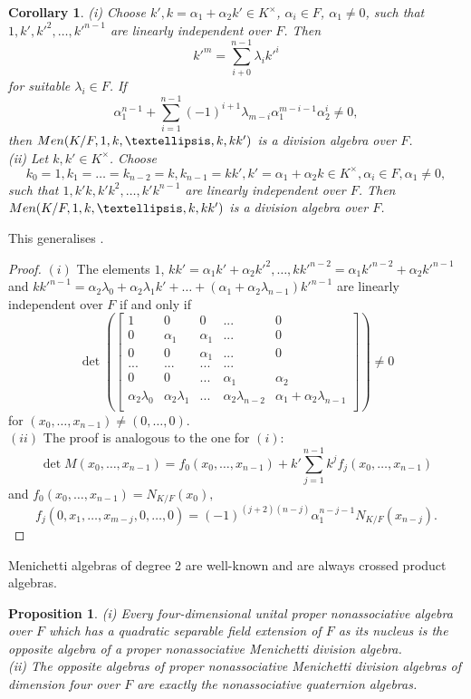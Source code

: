 \documentclass[11pt]{amsart}
\theoremstyle{plain}
\newtheorem{proposition}[theorem]{Proposition}
\newtheorem{corollary}[theorem]{Corollary}
\theoremstyle{definition}
\begin{document}
 \begin{corollary}  \label{cor:M1}
 (i) Choose $k',k=\alpha_1+\alpha_2k'\in K^\times$, $\alpha_i\in F$, $\alpha_1\not=0$, such that $1,k',k'^2,\dots,k'^{n-1}$ are linearly independent over $F$.
  Then
 $$k'^{m}=\sum_{i+0}^{n-1}\lambda_i k'^i$$
  for suitable $\lambda_i\in F$. If
 $$\alpha_1^{n-1}+\sum_{i=1}^{n-1} (-1)^{i+1}\lambda_{m-i}\alpha_1^{m-i-1} \alpha_2^{i}\not=0,$$
 then ${\rm Men}(K/F,1,k,\dots,k,kk')$ is a division algebra  over $F$.
 \\ (ii) Let $k,k'\in K^\times$.
 Choose
 $$k_0=1, k_1=\dots=k_{n-2}=k, k_{n-1}=kk', k'=\alpha_1+\alpha_2k\in K^\times, \alpha_i\in F, \alpha_1\not=0,$$
  such that $1,k'k,k'k^2,\dots,k'k^{n-1}$ are linearly independent over $F$. Then ${\rm Men}(K/F,1,k,\dots,k,kk')$ is a division algebra  over $F$.
 \end{corollary}


This generalises \cite[p. 345]{M}.


 \begin{proof}
 $(i)$ The elements $1$, $kk'=\alpha_1k'+\alpha_2k'^2, \dots,kk'^{n-2}=\alpha_1k'^{n-2}+\alpha_2k'^{n-1}$ and
 $kk'^{n-1}=\alpha_2\lambda_0+   \alpha_2\lambda_1k'+\dots+ (\alpha_1+\alpha_2 \lambda_{n-1})k'^{n-1}$  are linearly independent over $F$ if and only if
 \[\det(\left [\begin {array}{ccccccc}
1 & 0 & 0 &... & 0\\
0 & \alpha_1 & \alpha_1&... &  0\\
0& 0 & \alpha_1 & ... & 0\\
...& ...  & ... & ...\\
0 &  0  & ...& \alpha_1 & \alpha_2\\
\alpha_2 \lambda_0 &  \alpha_2 \lambda_1 & ...  & \alpha_2 \lambda_{n-2}& \alpha_1 +\alpha_2 \lambda_{n-1}\\
\end {array}\right ])\not=0
 \]
 for $(x_0,\dots,x_{n-1})\not=(0,\dots,0)$.
 \\ $(ii)$ The proof is analogous to the one for $(i)$:
 $$\det M(x_0,\dots,x_{n-1})=f_0(x_0,\dots,x_{n-1})+k' \sum_{j=1}^{n-1} k^jf_j(x_0,\dots,x_{n-1})$$
 and
 $f_0(x_0,\dots,x_{n-1})=N_{K/F}(x_0),$
 $$f_j(0,x_1,\dots,x_{m-j},0,\dots,0)=(-1)^{(j+2)(n-j)}\alpha_1^{n-j-1}N_{K/F}(x_{n-j}).$$
 \end{proof}

Menichetti algebras of degree 2 are well-known and are always crossed product algebras.

\begin{proposition}
(i) Every four-dimensional unital proper nonassociative  algebra over  $F$ which has a quadratic separable field extension of $F$ as its nucleus is the opposite algebra of  a
proper nonassociative Menichetti division algebra.
\\
(ii) The opposite algebras of  proper nonassociative Menichetti division algebras of dimension four over $F$ are exactly the nonassociative quaternion algebras.
\end{proposition}
\end{document}
